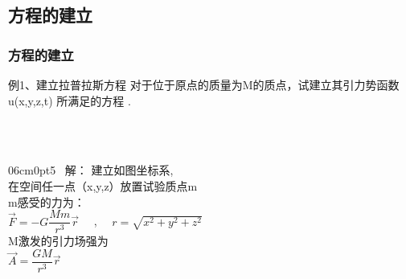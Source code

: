 \subsection{方程的建立}
\begin{frame}
	\frametitle{方程的建立}
	\begin{exampleblock} {例1、建立拉普拉斯方程}
		对于位于原点的质量为M的质点，试建立其引力势函数
		u(x,y,z,t) 所满足的方程 .
	\end{exampleblock}
	\opencutright 
	\def\windowpagestuff{\flushright 
	\begin{tikzpicture}
		\def\k{1.5}
		\draw [ ->] (0,0,0) --  (0,0,2.5)  node[below] {$z$};
		\draw [ ->]  (0,0,0) -- (\k, 0,0)   node[right] {$x$};
		\draw [ ->]  (0,0,0) -- (0,\k, 0)    node[right] {$y$};
		\fill[black!100] (0,0,0) node[right]{$M$} circle(0.8ex);
		\begin{scope}[canvas is zy plane at x=0] \draw (0,0) circle (1cm);
			\draw (-1,0) -- (1,0) (0,-1) -- (0,1);
		\end{scope};
		\begin{scope}[canvas is zx plane at y=0] \draw (0,0) circle (1cm);
			\draw (-1,0) -- (1,0) (0,-1) -- (0,1);
		\end{scope};
		\begin{scope}[canvas is xy plane at z=0] \draw (0,0) circle (1cm);
			\draw (-1,0) -- (1,0) (0,-1) -- (0,1);
		\end{scope};
	\end{tikzpicture}	}
	~~~\hspace*{\fill} \\	
	~~~\hspace*{\fill} \\	
	\begin{cutout} {0}{6cm}{0pt}{5}
		\alert{ 解：}	建立如图坐标系,\\
		在空间任一点（x,y,z）放置试验质点m\\
 		m感受的力为：\\
		{$ \overrightarrow{F} =-G\dfrac{Mm}{r^3} \overrightarrow {r} $ }  ~~,~~ $r=\sqrt{x^2+y^2+z^2}$\\ 
		M激发的引力场强为 \\
		{ $ \overrightarrow{A} =\dfrac{GM}{r^3} \overrightarrow{r} $ }\\
	\end{cutout}
\end{frame}	

